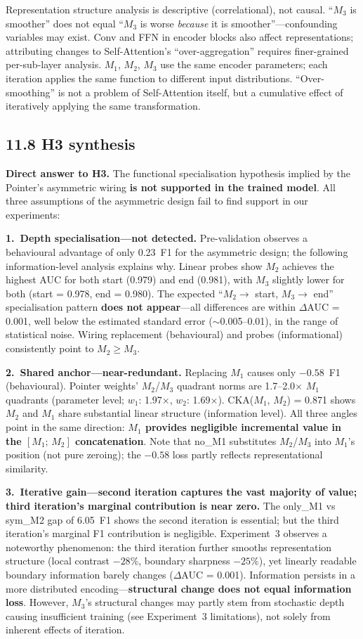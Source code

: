 \documentclass[10pt]{article}
\newcommand{\ReportSubsection}[1]{%
 \Needspace{24\baselineskip}%
 \phantomsection
 \subsection*{#1}%
 \addcontentsline{toc}{subsection}{#1}%
 \vspace{-0.12em}%
}
\begin{document}
Representation structure analysis is descriptive (correlational), not causal. ``$M_3$ is smoother'' does not equal ``$M_3$ is worse \emph{because} it is smoother''---confounding variables may exist. Conv and FFN in encoder blocks also affect representations; attributing changes to Self-Attention's ``over-aggregation'' requires finer-grained per-sub-layer analysis. $M_1$, $M_2$, $M_3$ use the same encoder parameters; each iteration applies the same function to different input distributions. ``Over-smoothing'' is not a problem of Self-Attention itself, but a cumulative effect of iteratively applying the same transformation.

\ReportSubsection{11.8 H3 synthesis}

\textbf{Direct answer to H3.} The functional specialisation hypothesis implied by the Pointer's asymmetric wiring \textbf{is not supported in the trained model}. All three assumptions of the asymmetric design fail to find support in our experiments:

\textbf{1.\ Depth specialisation---not detected.} Pre-validation observes a behavioural advantage of only 0.23~F1 for the asymmetric design; the following information-level analysis explains why. Linear probes show $M_2$ achieves the highest AUC for both start (0.979) and end (0.981), with $M_3$ slightly lower for both (start = 0.978, end = 0.980). The expected ``$M_2 \to$ start, $M_3 \to$ end'' specialisation pattern \textbf{does not appear}---all differences are within $\Delta$AUC = 0.001, well below the estimated standard error ($\sim$0.005--0.01), in the range of statistical noise. Wiring replacement (behavioural) and probes (informational) consistently point to $M_2 \geq M_3$.

\textbf{2.\ Shared anchor---near-redundant.} Replacing $M_1$ causes only $-0.58$~F1 (behavioural). Pointer weights' $M_2$/$M_3$ quadrant norms are 1.7--2.0$\times$ $M_1$ quadrants (parameter level; $w_1$: 1.97$\times$, $w_2$: 1.69$\times$). CKA($M_1$, $M_2$) = 0.871 shows $M_2$ and $M_1$ share substantial linear structure (information level). All three angles point in the same direction: \textbf{$M_1$ provides negligible incremental value in the $[M_1;\, M_2]$ concatenation}. Note that no\_M1 substitutes $M_2$/$M_3$ into $M_1$'s position (not pure zeroing); the $-0.58$ loss partly reflects representational similarity.

\textbf{3.\ Iterative gain---second iteration captures the vast majority of value; third iteration's marginal contribution is near zero.} The only\_M1 vs sym\_M2 gap of 6.05~F1 shows the second iteration is essential; but the third iteration's marginal F1 contribution is negligible. Experiment~3 observes a noteworthy phenomenon: the third iteration further smooths representation structure (local contrast $-28\%$, boundary sharpness $-25\%$), yet linearly readable boundary information barely changes ($\Delta$AUC = 0.001). Information persists in a more distributed encoding---\textbf{structural change does not equal information loss}. However, $M_3$'s structural changes may partly stem from stochastic depth causing insufficient training (see Experiment~3 limitations), not solely from inherent effects of iteration.
\end{document}
